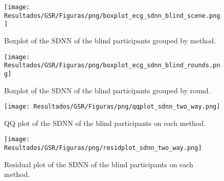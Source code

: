 \begin{figure}[!htb]
    \centering
    \begin{minipage}{0.45\textwidth}
        \centering
        \texttt{[image: Resultados/GSR/Figuras/png/boxplot\_ecg\_sdnn\_blind\_scene.png]}
        \caption{Boxplot of the SDNN of the blind participants grouped by method.}
        \label{fig:boxplot_ecg_sdnn_blind_scene}
    \end{minipage}
    \begin{minipage}{0.45\textwidth}
        \centering
        \texttt{[image: Resultados/GSR/Figuras/png/boxplot\_ecg\_sdnn\_blind\_rounds.png]}
        \caption{Boxplot of the SDNN of the blind participants grouped by round.}
        \label{fig:boxplot_ecg_sdnn_blind_rounds}
    \end{minipage}
\end{figure}




\begin{figure}[!htb]
    \centering
    \begin{minipage}{0.45\textwidth}
        \centering
        \texttt{[image: Resultados/GSR/Figuras/png/qqplot\_sdnn\_two\_way.png]}
        \caption{QQ plot of the SDNN of the blind participants on each method.}
        \label{fig:qqplot_sdnn_two_way}
    \end{minipage}
    \begin{minipage}{0.45\textwidth}
        \centering
        \texttt{[image: Resultados/GSR/Figuras/png/residplot\_sdnn\_two\_way.png]}
        \caption{Residual plot of the SDNN of the blind participants on each method.}
        \label{fig:residplot_sdnn_two_way}
    \end{minipage}
\end{figure}




\FloatBarrier

